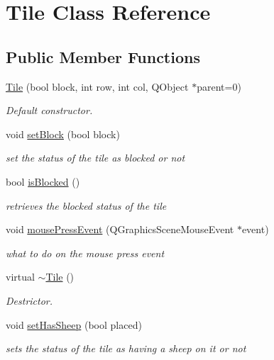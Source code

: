\hypertarget{classTile}{\section{\-Tile \-Class \-Reference}
\label{classTile}
}
\subsection*{\-Public \-Member \-Functions}
\begin{DoxyCompactItemize}
\item 
\hyperlink{classTile_ae086b4175de8e1826229c9447e0d7de0}{\-Tile} (bool block, int row, int col, \-Q\-Object $\ast$parent=0)
\begin{DoxyCompactList}\small\item\em \-Default constructor. \end{DoxyCompactList}\item 
void \hyperlink{classTile_afe226f718d68cf50f2c9f4067dc84eb2}{set\-Block} (bool block)
\begin{DoxyCompactList}\small\item\em set the status of the tile as blocked or not \end{DoxyCompactList}\item 
bool \hyperlink{classTile_a040dfc1b837d2a7f5bc63c0d1017ece4}{is\-Blocked} ()
\begin{DoxyCompactList}\small\item\em retrieves the blocked status of the tile \end{DoxyCompactList}\item 
void \hyperlink{classTile_aecbd71c0de7fe3fd79bb1b8bbca4f265}{mouse\-Press\-Event} (\-Q\-Graphics\-Scene\-Mouse\-Event $\ast$event)
\begin{DoxyCompactList}\small\item\em what to do on the mouse press event \end{DoxyCompactList}\item 
virtual \hyperlink{classTile_a98634abbd93fa13d0578d7103202d03d}{$\sim$\-Tile} ()
\begin{DoxyCompactList}\small\item\em \-Destrictor. \end{DoxyCompactList}\item 
void \hyperlink{classTile_a9582c3c092f3cdd7fbd4fa37c8f4ab22}{set\-Has\-Sheep} (bool placed)
\begin{DoxyCompactList}\small\item\em sets the status of the tile as having a sheep on it or not \end{DoxyCompactList}\item 

\end{DoxyCompactItemize}
